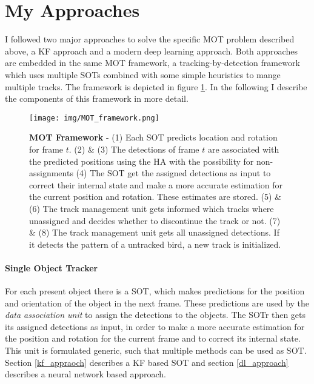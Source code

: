\documentclass[12pt,a4paper]{article}
\begin{document}


\section{My Approaches}
\label{approaches}
I followed two major approaches to solve the specific MOT problem described above, a KF approach and a modern deep learning approach. Both approaches are embedded in the same MOT framework, a tracking-by-detection framework which uses multiple SOTs combined with some simple heuristics to mange multiple tracks. The framework is depicted in figure \ref{flow_chart}. In the following I describe the components of this framework in more detail.


\begin{figure}[!htbp]
	\begin{center}
		\texttt{[image: img/MOT\_framework.png]}
		\caption{ \textbf{MOT Framework} - 
			(1) Each SOT predicts location and rotation for frame $t$. (2) \& (3) The detections of frame $t$ are associated with the predicted positions using the HA with the possibility for non-assignments (4) The SOT get the assigned detections as input to correct their internal state and make a more accurate estimation for the current position and rotation. These estimates are stored. (5) \& (6) The track management unit gets informed which tracks where unassigned and decides whether to discontinue the track or not. (7) \& (8) The track management unit gets all unassigned detections. If it detects the pattern of a untracked bird, a new track is initialized. }
		\label{flow_chart}
	\end{center}
\end{figure}

\paragraph{Single Object Tracker} 
For each present object there is a SOT, which makes predictions for the position and orientation of the object in the next frame. These predictions are used by the \emph{data association unit} to assign the detections to the objects. The SOTr then gets its assigned detections as input, in order to make a more accurate estimation for the position and rotation for the current frame and to correct its internal state.\\
This unit is formulated generic, such that multiple methods can be used as SOT. Section \ref{kf_appraoch} describes a KF based SOT and section \ref{dl_approach} describes a neural network based approach.
\end{document}
